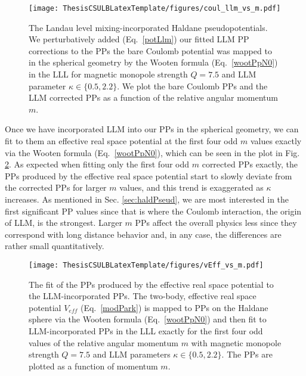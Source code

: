     \begin{figure}[H]
    \begin{center}
    \texttt{[image: ThesisCSULBLatexTemplate/figures/coul\_llm\_vs\_m.pdf]}
    \caption[The Landau level mixing-incorporated Haldane pseudopotentials.]{The Landau level mixing-incorporated Haldane pseudopotentials. We perturbatively added (Eq.~\ref{potLlm}) our fitted LLM PP corrections to the PPs the bare Coulomb potential was mapped to in the spherical geometry by the Wooten formula (Eq.~\ref{wootPpN0}) in the LLL for magnetic monopole strength $Q=7.5$ and LLM parameter $\kappa\in\{0.5,2.2\}$. We plot the bare Coulomb PPs and the LLM corrected PPs as a function of the relative angular momentum $m$.}
    \label{fig:coul_llm_vs_m} 
    \end{center}
    \end{figure}

    \vspace{24pt} %
    
    Once we have incorporated LLM into our PPs in the spherical geometry, we can fit to them an effective real space potential at the first four odd $m$ values exactly via the Wooten formula (Eq.~\ref{wootPpN0}), which can be seen in the plot in Fig. \ref{fig:vEff_vs_m}. As expected when fitting only the first four odd $m$ corrected PPs exactly, the PPs produced by the effective real space potential start to slowly deviate from the corrected PPs for larger $m$ values, and this trend is exaggerated as $\kappa$ increases. As mentioned in Sec. \ref{sec:haldPseud}, we are most interested in the first significant PP values since that is where the Coulomb interaction, the origin of LLM, is the strongest. Larger $m$ PPs affect the overall physics less since they correspond with long distance behavior and, in any case, the differences are rather small quantitatively.
    
    \begin{figure}[H]
    \begin{center}
    \texttt{[image: ThesisCSULBLatexTemplate/figures/vEff\_vs\_m.pdf]}
    \caption[The fit of the PPs produced by the effective real space potential to the LLM-incorporated PPs.]{The fit of the PPs produced by the effective real space potential to the LLM-incorporated PPs. The two-body, effective real space potential $V_{eff}$ (Eq.~\ref{modPark}) is mapped to PPs on the Haldane sphere via the Wooten formula (Eq.~\ref{wootPpN0}) and then fit to LLM-incorporated PPs in the LLL exactly for the first four odd values of the relative angular momentum $m$ with magnetic monopole strength $Q=7.5$ and LLM parameters $\kappa\in\{0.5,2.2\}$. The PPs are plotted as a function of momentum $m$.}
    \label{fig:vEff_vs_m} 
    \end{center}
    \end{figure}
    
